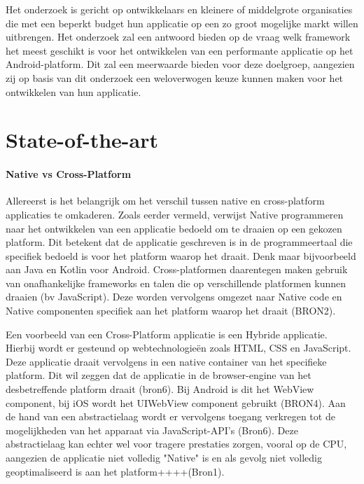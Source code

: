 Het onderzoek is gericht op ontwikkelaars en kleinere of middelgrote organisaties die met een beperkt budget hun applicatie op een zo groot mogelijke markt willen uitbrengen. Het onderzoek zal een antwoord bieden op de vraag welk framework het meest geschikt is voor het ontwikkelen van een performante applicatie op het Android-platform. Dit zal een meerwaarde bieden voor deze doelgroep, aangezien zij op basis van dit onderzoek een weloverwogen keuze kunnen maken voor het ontwikkelen van hun applicatie.



\section{State-of-the-art}%
\label{sec:state-of-the-art}

\paragraph{Native vs Cross-Platform}
\newline
Allereerst is het belangrijk om het verschil tussen native en cross-platform applicaties te omkaderen. Zoals eerder vermeld, verwijst Native programmeren naar het ontwikkelen van een applicatie bedoeld om te draaien op een gekozen platform. Dit betekent dat de applicatie geschreven is in de programmeertaal die specifiek bedoeld is voor het platform waarop het draait. Denk maar bijvoorbeeld aan Java en Kotlin voor Android. Cross-platformen daarentegen maken gebruik van onafhankelijke frameworks en talen die op verschillende platformen kunnen draaien (bv JavaScript). Deze worden vervolgens omgezet naar Native code en Native componenten specifiek aan het platform waarop het draait (BRON2).

Een voorbeeld van een Cross-Platform applicatie is een Hybride applicatie. Hierbij wordt er gesteund op webtechnologieën zoals HTML, CSS en JavaScript. Deze applicatie draait vervolgens in een native container van het specifieke platform. Dit wil zeggen dat de applicatie in de browser-engine van het desbetreffende platform draait (bron6). Bij Android is dit het WebView component, bij iOS wordt het UIWebView component gebruikt (BRON4). Aan de hand van een abstractielaag wordt er vervolgens toegang verkregen tot de mogelijkheden van het apparaat via JavaScript-API's (Bron6). Deze abstractielaag kan echter wel voor tragere prestaties zorgen, vooral op de CPU, aangezien de applicatie niet volledig "Native" is en als gevolg niet volledig geoptimaliseerd is aan het platform++++(Bron1).

